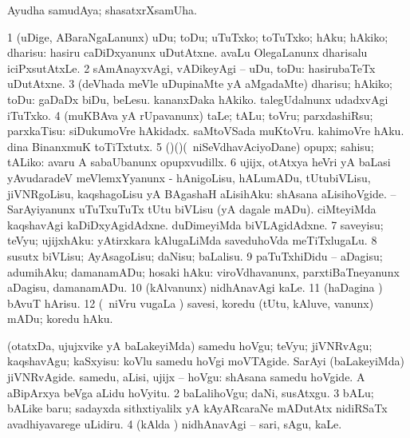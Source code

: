 {\bentry
{} 
\gl{\nA}
\expl{}
\bmng
Ayudha samudAya; shasatxrXsamUha. 
\emng
\eentry

\bentry
{} 
\gl{\kirx}
\bmng
\emng

\noindent 
\gl{\sakirx}
\expl{}
\bmng
\bnum
\num{1} (uDige, ABaraNgaLanunx) uDu; toDu; uTuTxko; toTuTxko; hAku; hAkiko; dharisu:  hasiru caDiDxyanunx uDutAtxne.  avaLu OlegaLanunx dharisalu iciPxsutAtxLe. 
\num{2} sAmAnayxvAgi, vADikeyAgi -- uDu, toDu:  hasirubaTeTx uDutAtxne. 
\num{3} (deVhada meVle uDupinaMte yA aMgadaMte) dharisu; hAkiko; toDu:  gaDaDx biDu, beLesu.  kananxDaka hAkiko.  talegUdalnunx udadxvAgi iTuTxko. 
\num{4} (muKBAva yA rUpavanunx) taLe; tALu; toVru; parxdashiRsu; parxkaTisu:  siDukumoVre hAkidadx.  saMtoVSada muKtoVru.  kahimoVre hAku.  dina BinanxmuK toTiTxtutx. 
\num{5} (\birx)(\AmA)(\sA\ niSeVdhavAciyoDane) opupx; sahisu; tALiko:  avaru A sabaUbanunx opupxvudillx. 
\num{6} ujijx, otAtxya heVri yA baLasi yAvudaradeV meVlemxYyanunx - hAnigoLisu, hALumADu, tUtubiVLisu, jiVNRgoLisu, kaqshagoLisu yA BAgashaH aLisihAku:  shAsana aLisihoVgide.  -- SarAyiyanunx uTuTxuTuTx tUtu biVLisu (yA dagale mADu).  ciMteyiMda kaqshavAgi kaDiDxyAgidAdxne.  duDimeyiMda biVLAgidAdxne. 
\num{7} saveyisu; teVyu; ujijxhAku:  yAtirxkara kAlugaLiMda saveduhoVda meTiTxlugaLu. 
\num{8} susutx biVLisu; AyAsagoLisu; daNisu; baLalisu. 
\num{9} paTuTxhiDidu -- aDagisu; adumihAku; damanamADu; hosaki hAku:  viroVdhavanunx, parxtiBaTneyanunx aDagisu, damanamADu. 
\num{10} (kAlvanunx) nidhAnavAgi kaLe. 
\num{11} (haDagina \vi) bAvuT hArisu. 
\num{12} (\sA\ niVru \mo vugaLa \vi) savesi, koredu (tUtu, kAluve, \mo vanunx) mADu; koredu hAku. 
\enum
\emng

\noindent 
\gl{\akirx}
\expl{}
\bmng
\bnum
{} (otatxDa, ujujxvike yA baLakeyiMda) 
\banum
{} samedu hoVgu; teVyu; jiVNRvAgu; kaqshavAgu; kaSxyisu:  koVlu samedu hoVgi moVTAgide.  SarAyi (baLakeyiMda) jiVNRvAgide. 
 samedu, aLisi, ujijx -- hoVgu:  shAsana samedu hoVgide.  A aBipArxya beVga aLidu hoVyitu. 
\eanum
\numie
\num{2} baLalihoVgu; daNi, susAtxgu. 
\num{3} bALu; bALike baru; sadayxda sithxtiyalilx yA kAyARcaraNe mADutAtx nidiRSaTx avadhiyavarege uLidiru. 
\num{4} (kAlda \vi) nidhAnavAgi -- sari, sAgu, kaLe. 
\enum
\emng

}
